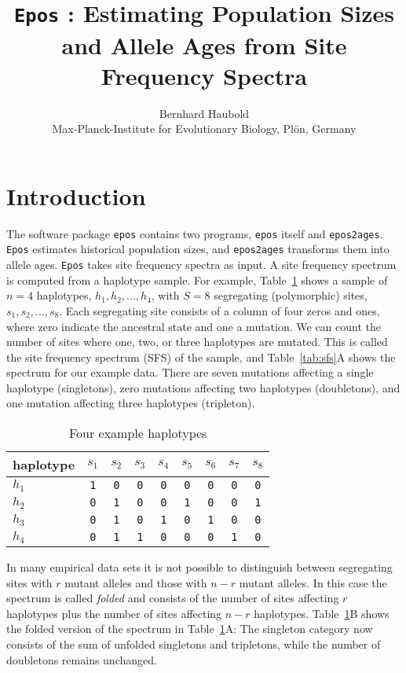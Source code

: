 \documentclass[a4paper, english]{article}
\newcommand{\ty}{\texttt}
\begin{document}
\title{\ty{Epos} : Estimating Population Sizes and Allele Ages from
  Site Frequency Spectra}
\author{Bernhard Haubold\\\small Max-Planck-Institute for Evolutionary
  Biology, Pl\"on, Germany}
\date{}
\maketitle
\section{Introduction} 
The software package \ty{epos} contains two programs, \ty{epos}
itself and \ty{epos2ages}. \ty{Epos} estimates historical population
sizes, and \ty{epos2ages} transforms them into allele ages. \ty{Epos} takes site frequency spectra as input. A site frequency
spectrum is computed from a haplotype sample. For example, Table~\ref{tab:hap}
shows a sample of $n=4$ haplotypes, $h_1, h_2,...,h_4$, with $S=8$
segregating (polymorphic) sites, $s_1, s_2,...,s_8$. Each segregating
site consists of a column of four zeros and ones, where zero indicate
the ancestral state and one a mutation. We can count the number of
sites where one, two, or three haplotypes are mutated. This is called
the site frequency spectrum (SFS) of the sample, and
Table~\ref{tab:sfs}A shows the spectrum for our example data. There
are seven mutations affecting a single haplotype (singletons), zero
mutations affecting two haplotypes (doubletons), and one mutation
affecting three haplotypes (tripleton).
\begin{table}
  \caption{Four example haplotypes}\label{tab:hap}
  \begin{center}
    \begin{tabular}{lcccccccc}\hline
haplotype   &   $s_1$ & $s_2$ & $s_3$ & $s_4$ & $s_5$ & $s_6$ & $s_7$ & $s_8$\\\hline
$h_1$ &      \ty{1} & \ty{0} & \ty{0} & \ty{0} & \ty{0} & \ty{0} & \ty{0} & \ty{0}\\
$h_2$ &      \ty{0} & \ty{1} & \ty{0} & \ty{0} & \ty{1} & \ty{0} & \ty{0} & \ty{1}\\
$h_3$ &      \ty{0} & \ty{1} & \ty{0} & \ty{1} & \ty{0} & \ty{1} & \ty{0} & \ty{0}\\
$h_4$ &      \ty{0} & \ty{1} & \ty{1} & \ty{0} & \ty{0} & \ty{0} & \ty{1} &
      \ty{0}\\\hline
      \end{tabular}
  \end{center}
\end{table}
In many empirical data sets it is not possible to distinguish between
segregating sites with $r$ mutant alleles and those with $n-r$
mutant alleles. In this case the spectrum is called \textit{folded} and
consists of the
number of sites affecting $r$ haplotypes plus the number of sites
affecting $n-r$ haplotypes. Table~\ref{tab:hap}B shows the folded
version of the spectrum in Table~\ref{tab:hap}A: The singleton
category now consists of the sum of unfolded singletons and
tripletons, while the number of doubletons
remains unchanged.
\end{document}

